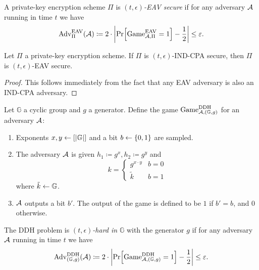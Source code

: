 \begin{definition}
	A private-key encryption scheme $\Pi$ is \emph{$(t, \epsilon)$-EAV secure} if for any adversary $\mathcal{A}$ running in time $t$ we have
	\begin{align*}
		\mathrm{Adv}_{\Pi}^{\mathrm{EAV}}(\adv) \coloneqq 2 \cdot \abs*{\pr{\mathrm{Game}_{\adv, \Pi}^{\mathrm{EAV}} = 1} - \frac{1}{2}} \le \epsilon.
	\end{align*}
\end{definition}


\begin{lemma}
	Let $\Pi$ a private-key encryption scheme. If $\Pi$ is $(t, \epsilon)$-IND-CPA secure, then $\Pi$ is $(t, \epsilon)$-EAV secure.
\end{lemma}
\begin{proof}
	This follows immediately from the fact that any EAV adversary is also an IND-CPA adversary.
\end{proof}

\begin{definition}
	Let $\mathbb{G}$ a cyclic group and $g$ a generator. Define the game $\mathrm{Game}_{\mathcal{A}, (\mathbb{G}, g)}^{\mathrm{DDH}}$ for an adversary $\mathcal{A}$:
	\begin{enumerate}[1.]
		\item Exponents $x, y \leftarrow [\lvert\mathbb{G}\rvert]$ and a bit $b \leftarrow \{0, 1\}$ are sampled.
		\item The adversary $\mathcal{A}$ is given $h_1 \coloneqq g^x, h_2 \coloneqq g^y$ and
		      \[
			      k = \begin{cases}
				      g^{x \cdot y} & b = 0 \\
				      \tilde{k}     & b = 1
			      \end{cases}
		      \]
		      where $\tilde{k} \leftarrow \mathbb{G}$.
		\item $\mathcal{A}$ outputs a bit $b'$. The output of the game is defined to be $1$ if $b' = b$, and $0$ otherwise.
	\end{enumerate}
\end{definition}

\begin{definition}
	The DDH problem is \emph{$(t, \epsilon)$-hard in} $\mathbb{G}$ with the generator $g$ if for any adversary $\mathcal{A}$ running in time $t$ we have
	\begin{align*}
		\mathrm{Adv}_{(\mathbb{G}, g)}^{\mathrm{DDH}}(\adv) \coloneqq 2 \cdot \abs*{\pr{\mathrm{Game}_{\adv, (\mathbb{G}, g)}^{\mathrm{DDH}} = 1} - \frac{1}{2}} \le \epsilon.
	\end{align*}
\end{definition}

